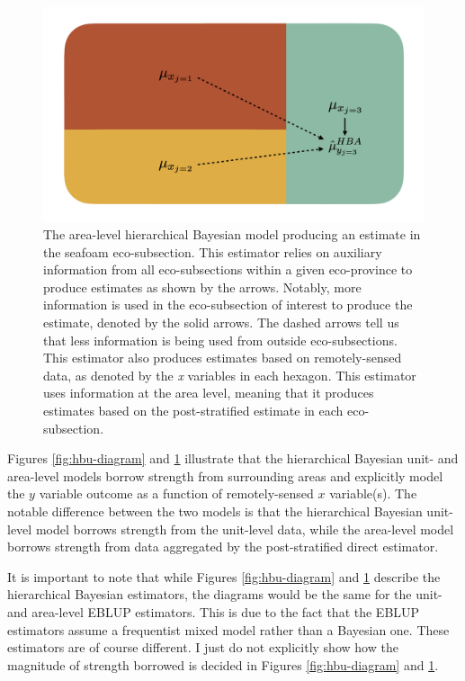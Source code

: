 \documentclass[12pt,twoside]{reedthesis}
\begin{document}
\clearpage
\begin{figure}

{\centering \includegraphics[width=1\linewidth]{figure/hba-diagram} 

}

\caption[The area-level hierarchical Bayesian model]{The area-level hierarchical Bayesian model producing an estimate in the seafoam eco-subsection. This estimator relies on auxiliary information from all eco-subsections within a given eco-province to produce estimates as shown by the arrows. Notably, more information is used in the eco-subsection of interest to produce the estimate, denoted by the solid arrows. The dashed arrows tell us that less information is being used from outside eco-subsections. This estimator also produces estimates based on remotely-sensed data, as denoted by the \textit{x} variables in each hexagon. This estimator uses information at the area level, meaning that it produces estimates based on the post-stratified estimate in each eco-subsection.}\label{fig:hba-diagram}
\end{figure}
Figures \ref{fig:hbu-diagram} and \ref{fig:hba-diagram} illustrate that the hierarchical Bayesian unit- and area-level models borrow strength from surrounding areas and explicitly model the \(y\) variable outcome as a function of remotely-sensed \(x\) variable(s). The notable difference between the two models is that the hierarchical Bayesian unit-level model borrows strength from the unit-level data, while the area-level model borrows strength from data aggregated by the post-stratified direct estimator.

It is important to note that while Figures \ref{fig:hbu-diagram} and \ref{fig:hba-diagram} describe the hierarchical Bayesian estimators, the diagrams would be the same for the unit- and area-level EBLUP estimators. This is due to the fact that the EBLUP estimators assume a frequentist mixed model rather than a Bayesian one. These estimators are of course different. I just do not explicitly show how the magnitude of strength borrowed is decided in Figures \ref{fig:hbu-diagram} and \ref{fig:hba-diagram}.
\end{document}
